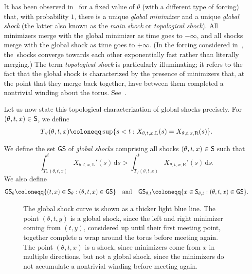 \documentclass[AHL,Unicode,longabstracts]{cedram}
\newcommand*\ssS{\mathsf{S}}
\newcommand*\GS{\mathsf{GS}}
\newcommand*\st{\mathrel{:}}
\newcommand*\dif{\mathrm{d}}
\newcommand*\Left{\mathrm{L}}
\newcommand*\Right{\mathrm{R}}
\let\oldin\in
\renewcommand{\in}{\mathchoice{\oldin}{\oldin}{\,\oldin\,}{\,\oldin\,}}
\let\originalleft\left
\let\originalright\right
\renewcommand{\left}{\mathopen{}\mathclose\bgroup\originalleft}
\renewcommand{\right}{\aftergroup\egroup\originalright}
\begin{document}
It has been observed in~\cite{EKMS00} for a fixed value of $\theta$ (with a different type of forcing) that, with probability $1$, there is a unique \emph{global minimizer} and a unique \emph{global shock} (the latter also known as the \emph{main shock} or \emph{topological shock}). All minimizers merge with the global minimizer as time goes to $-\infty$, and all shocks merge with the global shock as time goes to $+\infty$. (In the forcing considered in~\cite{EKMS00}, the~shocks converge towards each other exponentially fast rather than literally merging.) The term \emph{topological shock }is particularly illuminating; it refers to the fact that the global shock is characterized by the presence of minimizers that, at the point that they merge back together, have between them completed a nontrivial winding about the torus. See~\cite[Theorem~5.2]{EKMS00}.

Let us now state this topological characterization of global shocks precisely. For $(\theta,t,x)\in\ssS$, we define
\begin{equation}\label{eq:Tveedef}
T_{\vee}(\theta,t,x)\coloneqq\sup\left\{s<t\st X_{\theta,t,x,\Left}(s)=X_{\theta,t,x,\Right}(s)\right\}.
\end{equation}

\begin{defi}\label{def:globalshocks}
We define the set $\GS$ of \emph{global shocks} comprising all shocks $(\theta,t,x)\in\ssS$ such that
\begin{equation}\label{eq:shockslopesdiffernt}
\int_{T_{\vee}(\theta,t,x)}^{t}X_{\theta,t,x,\Left}'(s)\,\dif s>\int_{T_{\vee}(\theta,t,x)}^{t}X_{\theta,t,x,\Right}'(s)\,\dif s.
\end{equation}
We also define
\[
\GS_{\theta}\coloneqq\{(t,x)\in\ssS_{\theta}\st(\theta,t,x)\in\GS\}\quad\text{and}\quad\GS_{\theta,t}\coloneqq\{x\in\ssS_{\theta,t}\st(\theta,t,x)\in\GS\}.
\]
\end{defi}

\begin{figure}[!htbp]
\begin{centering}

\end{centering}
\caption[The difference between global and non-global shocks]{The global shock curve is shown as a thicker light blue line. The point $(\theta,t,y)$ is a global shock, since the left and right minimizer coming from $(t,y)$, considered up until their first meeting point, together complete a wrap around the torus before meeting again. The point $(\theta,t,x)$ is a shock, since minimizers come from $x$ in multiple directions, but not a global shock, since the minimizers do not accumulate a nontrivial winding before meeting again.
}
\label{fig:global_shock_picture}
\end{figure}
\end{document}
